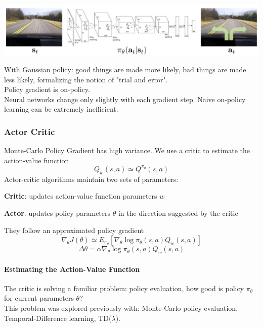 \documentclass[10pt]{report}
\begin{document}
\begin{center}
	\includegraphics[scale=0.5]{183.png}
\end{center}
With Gaussian policy: good things are made more likely, bad things are made less likely, formalizing the notion of "trial and error".\\
Policy gradient is on-policy.\\
Neural networks change only slightly with each gradient step. Naive on-policy learning can be extremely inefficient.
\subsubsection{Actor Critic}
Monte-Carlo Policy Gradient has high variance. We use a critic to estimate the action-value function
$$Q_w(s,a)\simeq Q^{\pi_\theta}(s,a)$$
Actor-critic algorithms maintain two sets of parameters:
\begin{list}{}{}
	\item \textbf{Critic}: updates action-value function parameters $w$
	\item \textbf{Actor}: updates policy parameters $\theta$ in the direction suggested by the critic
\end{list}
They follow an approximated policy gradient
$$\nabla_\theta J(\theta) \simeq E_{\pi_\theta}[\nabla_\theta\log\pi_\theta(s,a)Q_w(s,a)]$$
$$\Delta\theta = \alpha\nabla_\theta\log\pi_\theta(s,a)Q_w(s,a)$$
\paragraph{Estimating the Action-Value Function} The critic is solving a familiar problem: policy evaluation, how good is policy $\pi_\theta$ for current parameters $\theta$?\\
This problem was explored previously with: Monte-Carlo policy evaluation, Temporal-Difference learning, TD($\lambda$).
\end{document}
